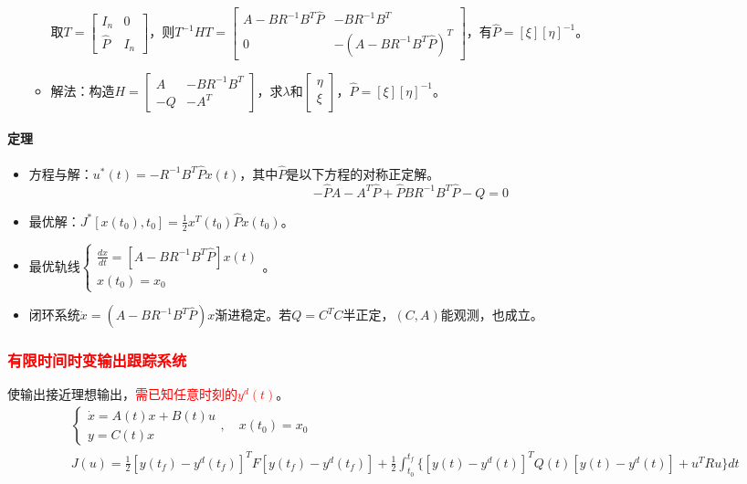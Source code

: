 \documentclass[
12pt, %
a4paper, 
oneside, %
]{scrartcl}
\begin{document}
\begin{itemize}
\begin{itemize}
取$ T = \begin{bmatrix} I_n & 0 \\ \hat{P} & I_n \end{bmatrix} $，则$ T^{-1} H T = \begin{bmatrix} A - B R^{-1} B^T \hat{P} & -B R^{-1} B^T \\ 0 & -(A - B R^{-1} B^T \hat{P})^T \end{bmatrix} $，有$ \hat{P} = [\xi] [\eta]^{-1} $。
\item 解法：构造$ H = \begin{bmatrix} A & -B R^{-1} B^T \\ -Q & -A^T \end{bmatrix} $，求$ \lambda $和$ \begin{bmatrix} \eta \\ \xi \end{bmatrix} $，$ \hat{P} = [\xi] [\eta]^{-1} $。
\end{itemize}
\end{itemize}
\paragraph{定理}
\begin{itemize}
\item 方程与解：$ u^*(t) = -R^{-1} B^T \hat{P} x(t) $，其中$ \hat{P} $是以下方程的对称正定解。
$$ -\hat{P} A - A^T \hat{P} + \hat{P} B R^{-1} B^T \hat{P} - Q = 0 $$
\item 最优解：$ J^*[x(t_0), t_0] = \frac{1}{2} x^T(t_0) \hat{P} x(t_0) $。
\item 最优轨线$ \begin{cases} \frac{d x}{d t} = [A - B R^{-1} B^T \hat{P}] x(t) \\ x(t_0) = x_0 \end{cases} $。
\item 闭环系统$ \dot{x} = (A - B R^{-1} B^T \hat{P}) x $渐进稳定。若$ Q = C^T C $半正定，$ (C, A) $能观测，也成立。
\end{itemize}
\subsubsection[有限时间时变输出跟踪系统]{\textcolor{red}{有限时间时变输出跟踪系统}}
使输出接近理想输出，\textcolor{red}{需已知任意时刻的$ y^d(t) $}。
\begin{align*}
&\begin{cases} \dot{x} = A(t) x + B(t) u \\ y = C(t) x \end{cases}, \quad x(t_0) = x_0 \\
&J(u) = \frac{1}{2} [y(t_f) - y^d(t_f)]^T F [y(t_f) - y^d(t_f)] + \frac{1}{2} \int_{t_0}^{t_f} \{[y(t) - y^d(t)]^T Q(t) [y(t) - y^d(t)] + u^T R u\} d t    
\end{align*}
\end{document}
